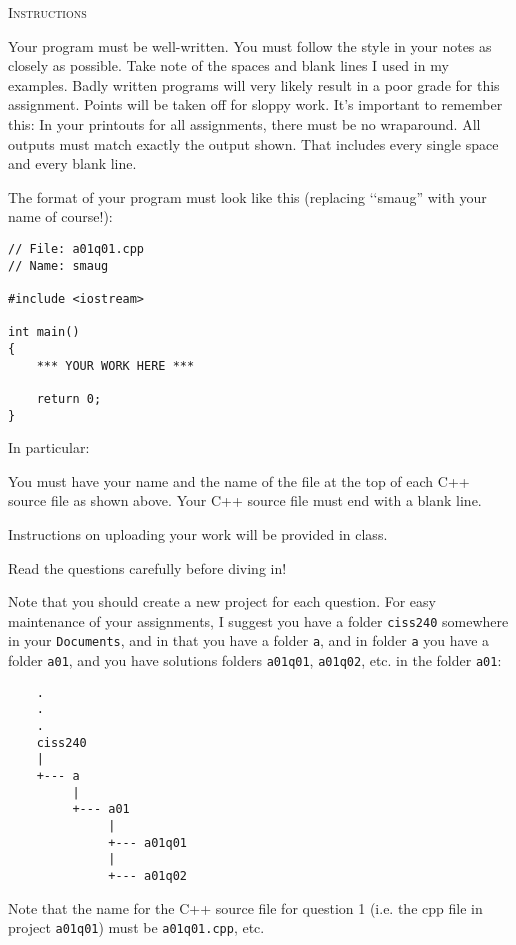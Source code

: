 \textsc{Instructions}
\begin{enumerate}[topsep=0pt,nosep]
\li Your program must be well-written. 
    You must follow the style in your notes as closely as possible. 
    Take note of the spaces and blank lines I used in my examples. 
    Badly written programs will very likely result in a poor grade for this 
    assignment. 
    Points will be taken off for sloppy work. 
\li It's important to remember this: In your printouts for all assignments, 
    there must be no wraparound.
\li All outputs must match exactly the output shown. 
    That includes every single space and every blank line.

\li The format of your program must look like this
(replacing \lq\lq smaug'' with your name of course!):
\begin{Verbatim}[frame=single,fontsize=\small]
// File: a01q01.cpp
// Name: smaug

#include <iostream>

int main()
{
    *** YOUR WORK HERE ***

    return 0;
}
\end{Verbatim}
In particular:
\begin{myenum}
\li You must have your name and the name of the file at the top of each 
    C++ source file as shown above.
\li Your C++ source file must end with a blank line.
\end{myenum}

\li Instructions on uploading your work will be provided in class.

\end{enumerate}


Read the questions carefully before diving in!

Note that you should create a new project for each question. 
For easy maintenance of your assignments, 
I suggest you have a folder \verb!ciss240! somewhere in your 
\verb!Documents!, and in that you have a folder \verb!a!, 
and in folder \verb!a! you have a folder \verb!a01!, 
and you have solutions folders \verb!a01q01!, \verb!a01q02!, etc. in the 
folder \verb!a01!:

\begin{Verbatim}
    .
    .
    .
    ciss240
    |
    +--- a
         |
         +--- a01
              |
              +--- a01q01
              |
              +--- a01q02
\end{Verbatim}

Note that the name for the C++ source file for question 1 
(i.e. the cpp file in 
project \verb!a01q01!) must be \verb!a01q01.cpp!, etc.
